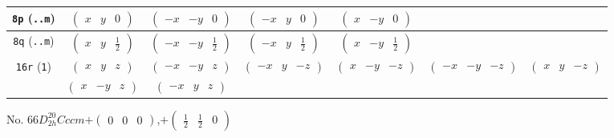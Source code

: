 \documentclass[fleqn,9pt,landscape]{jsarticle}
\begin{document}
\begin{center}
\begin{longtable}{ccccccc}
{\tt 8p} ({\tt ..m}) & $ \begin{pmatrix} x & y & 0 \end{pmatrix} $ & $ \begin{pmatrix} - x & - y & 0 \end{pmatrix} $ & $ \begin{pmatrix} - x & y & 0 \end{pmatrix} $ & $ \begin{pmatrix} x & - y & 0 \end{pmatrix} $ & $  $ & $  $ \\ \hline
{\tt 8q} ({\tt ..m}) & $ \begin{pmatrix} x & y & \frac{1}{2} \end{pmatrix} $ & $ \begin{pmatrix} - x & - y & \frac{1}{2} \end{pmatrix} $ & $ \begin{pmatrix} - x & y & \frac{1}{2} \end{pmatrix} $ & $ \begin{pmatrix} x & - y & \frac{1}{2} \end{pmatrix} $ & $  $ & $  $ \\ \hline
{\tt 16r} ({\tt 1}) & $ \begin{pmatrix} x & y & z \end{pmatrix} $ & $ \begin{pmatrix} - x & - y & z \end{pmatrix} $ & $ \begin{pmatrix} - x & y & - z \end{pmatrix} $ & $ \begin{pmatrix} x & - y & - z \end{pmatrix} $ & $ \begin{pmatrix} - x & - y & - z \end{pmatrix} $ & $ \begin{pmatrix} x & y & - z \end{pmatrix} $ \\
& $ \begin{pmatrix} x & - y & z \end{pmatrix} $ & $ \begin{pmatrix} - x & y & z \end{pmatrix} $ & $  $ & $  $ & $  $ & $  $ \\
\end{longtable}
\end{center}
\newpage
No. 66\quad$D_{2h}^{20}$\quad$Cccm$\quad[ orthorhombic ]\quad$+\begin{pmatrix} 0 & 0 & 0 \end{pmatrix}$,\quad $+\begin{pmatrix} \frac{1}{2} & \frac{1}{2} & 0 \end{pmatrix}$
\end{document}
